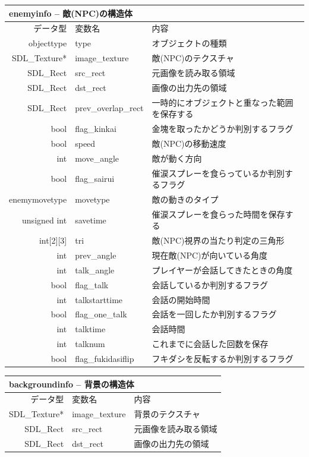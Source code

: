 \documentclass{jarticle}
\begin{document}
\begin{table}[H]
\begin{tabular}{|r|l|l|}
\hline
\multicolumn{3}{|l|}{enemyinfo -- 敵(NPC)の構造体}       \\ \hline
データ型      & 変数名    & 内容        \\ \hline
objecttype    & type & オブジェクトの種類  \\
SDL\_Texture* & image\_texture     & 敵(NPC)のテクスチャ \\
SDL\_Rect & src\_rect & 元画像を読み取る領域 \\
SDL\_Rect & dst\_rect & 画像の出力先の領域 \\
 SDL\_Rect & prev\_overlap\_rect & 一時的にオブジェクトと重なった範囲を保存する\\
bool & flag\_kinkai & 金塊を取ったかどうか判別するフラグ \\
bool & speed & 敵(NPC)の移動速度\\
int & move\_angle & 敵が動く方向\\
bool & flag\_sairui & 催涙スプレーを食らっているか判別するフラグ \\
enemymovetype  & movetype & 敵の動きのタイプ \\
unsigned int  & savetime & 催涙スプレーを食らった時間を保存する \\
int[2][3] & tri & 敵(NPC)視界の当たり判定の三角形 \\
int & prev\_angle & 現在敵(NPC)が向いている角度 \\
int  & talk\_angle & プレイヤーが会話してきたときの角度 \\
bool & flag\_talk & 会話しているか判別するフラグ \\
int & talkstarttime & 会話の開始時間 \\
bool & flag\_one\_talk & 会話を一回したか判別するフラグ \\
int & talktime & 会話時間 \\
int & talknum & これまでに会話した回数を保存\\
bool & flag\_fukidasiflip & フキダシを反転するか判別するフラグ \\ \hline
\end{tabular}
\end{table}

\begin{table}[H]
\begin{tabular}{|r|l|l|}
\hline
\multicolumn{3}{|l|}{backgroundinfo -- 背景の構造体}       \\ \hline
データ型      & 変数名    & 内容        \\ \hline
SDL\_Texture* & image\_texture     & 背景のテクスチャ \\
SDL\_Rect & src\_rect & 元画像を読み取る領域 \\
SDL\_Rect & dst\_rect & 画像の出力先の領域 \\ \hline
\end{tabular}
\end{table}
\end{document}

